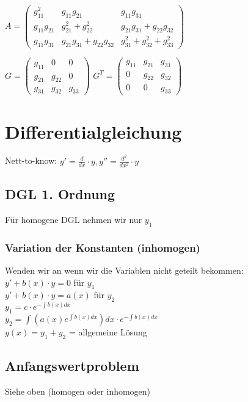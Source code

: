 \documentclass[a4paper, 8pt, landscape]{extarticle}
\let\oldint\int
\renewcommand{\int}{\ensuremath{\textstyle\oldint}}
\begin{document}
\begin{multicols*}{5}
			\begin{tiny}
				$A=\begin{pmatrix}
					g_{11}^{2} & g_{11}g_{21} & g_{11}g_{31}\\
					g_{11}g_{21} & g_{21}^{2}+g_{22}^{2} & g_{21}g_{31}+g_{22}g_{32}\\
					g_{11}g_{31} & g_{21}g_{31}+g_{22}g_{32} & g_{31}^{2}+g_{32}^{2}+g_{33}^{2}
				\end{pmatrix}$
				\begin{multicols}{2}
					$G=\begin{pmatrix}
						g_{11} & 0 & 0\\
						g_{21} & g_{22} & 0\\
						g_{31} & g_{32} & g_{33}
					\end{pmatrix}$
					$G^{T}=\begin{pmatrix}
						g_{11} & g_{21} & g_{31}\\
						0 & g_{22} & g_{32}\\
						0 & 0 & g_{33}
					\end{pmatrix}$
				\end{multicols}
			\end{tiny}
	\section{Differentialgleichung}
		Nett-to-know: $y'=\frac{d}{dx}\cdot y, y''= \frac{d^2}{dx^2}\cdot y$
		\subsection{DGL 1. Ordnung}
					Für homogene DGL nehmen wir nur $y_1$
			\subsubsection{Variation der Konstanten (inhomogen)}
				Wenden wir an wenn wir die Variablen nicht geteilt bekommen:\\
				$y'+b(x)\cdot y=0$ für $y_1$\\
				$y'+b(x)\cdot y=a(x)$ für $y_2$\\

				$y_1 = c\cdot e^{-\int b(x)dx}$\\
				$y_2 = \int(a(x)e^{\int b(x)dx})dx\cdot e^{-\int b(x)dx}$\\

				$y(x)=y_1+y_2$ = allgemeine Lösung
			\subsection{Anfangswertproblem}
				Siehe oben (homogen oder inhomogen)

\end{multicols*}
\end{document}
